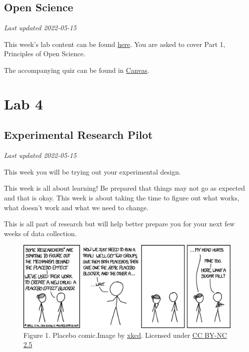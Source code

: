 \documentclass[
]{book}
\begin{document}
\hypertarget{open-science-1}{%
\chapter*{Open Science}\label{open-science-1}}

\emph{Last updated 2022-05-15}

This week's lab content can be found \href{https://ubco-biology.github.io/OS-Introduction/}{here}. You are asked to cover Part 1, Principles of Open Science.

The accompanying quiz can be found in \href{https://canvas.ubc.ca}{Canvas}.

\hypertarget{part-lab-4}{%
\part*{Lab 4}\label{part-lab-4}}

\hypertarget{experimental-research-pilot}{%
\chapter*{Experimental Research Pilot}\label{experimental-research-pilot}}

\emph{Last updated 2022-05-15}

This week you will be trying out your experimental design.

This week is all about learning! Be prepared that things may not go as expected and that is okay. This week is about taking the time to figure out what works, what doesn't work and what we need to change.

This is all part of research but will help better prepare you for your next few weeks of data collection.

\begin{figure}
\centering
\includegraphics{figures_images/Lab4-Fig1.png}
\caption{Figure 1. Placebo comic.Image by \href{https://xkcd.com/1526/}{xkcd}. Licensed under \href{https://creativecommons.org/licenses/by-nc/2.5/}{CC BY-NC 2.5}}
\end{figure}
\end{document}
